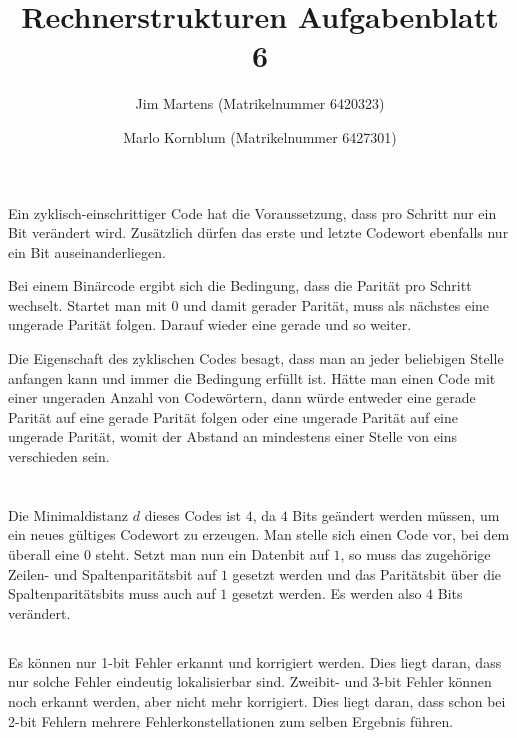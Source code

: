 \documentclass[10pt,a4paper,oneside,ngerman,numbers=noenddot]{scrartcl}
\begin{document}
\author{Jim Martens (Matrikelnummer 6420323) \and Marlo Kornblum (Matrikelnummer 6427301)}
\title{Rechnerstrukturen Aufgabenblatt 6}
\maketitle

\section{}%
Ein zyklisch-einschrittiger Code hat die Voraussetzung, dass pro Schritt nur ein Bit verändert wird. Zusätzlich dürfen das erste und letzte Codewort ebenfalls nur ein Bit auseinanderliegen. 

Bei einem Binärcode ergibt sich die Bedingung, dass die Parität pro Schritt wechselt. Startet man mit 0 und damit gerader Parität, muss als nächstes eine ungerade Parität folgen. Darauf wieder eine gerade und so weiter.

Die Eigenschaft des zyklischen Codes besagt, dass man an jeder beliebigen Stelle anfangen kann und immer die Bedingung erfüllt ist. Hätte man einen Code mit einer ungeraden Anzahl von Codewörtern, dann würde entweder eine gerade Parität auf eine gerade Parität folgen oder eine ungerade Parität auf eine ungerade Parität, womit der Abstand an mindestens einer Stelle von eins verschieden sein.

\section{}%
\subsection{} %
Die Minimaldistanz $d$ dieses Codes ist $4$, da $4$ Bits geändert werden müssen, um ein neues gültiges Codewort zu erzeugen. Man stelle sich einen Code vor, bei dem überall eine $0$ steht. Setzt man nun ein Datenbit auf $1$, so muss das zugehörige Zeilen- und Spaltenparitätsbit auf $1$ gesetzt werden und das Paritätsbit über die Spaltenparitätsbits muss auch auf $1$ gesetzt werden. Es werden also $4$ Bits verändert.
\subsection{} %
Es können nur 1-bit Fehler erkannt und korrigiert werden. Dies liegt daran, dass nur solche Fehler eindeutig lokalisierbar sind. Zweibit- und 3-bit Fehler können noch erkannt werden, aber nicht mehr korrigiert. Dies liegt daran, dass schon bei 2-bit Fehlern mehrere Fehlerkonstellationen zum selben Ergebnis führen.
\end{document}
